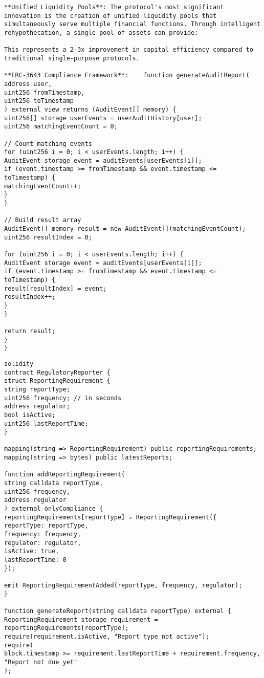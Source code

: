 \documentclass[12pt]{article}
\begin{document}
{{{\begin{itemize}
\begin{lstlisting}
**Unified Liquidity Pools**: The protocol's most significant innovation is the creation of unified liquidity pools that simultaneously serve multiple financial functions. Through intelligent rehypothecation, a single pool of assets can provide:

This represents a 2-3x improvement in capital efficiency compared to traditional single-purpose protocols.

**ERC-3643 Compliance Framework**:    function generateAuditReport(
address user,
uint256 fromTimestamp,
uint256 toTimestamp
) external view returns (AuditEvent[] memory) {
uint256[] storage userEvents = userAuditHistory[user];
uint256 matchingEventCount = 0;

// Count matching events
for (uint256 i = 0; i < userEvents.length; i++) {
AuditEvent storage event = auditEvents[userEvents[i]];
if (event.timestamp >= fromTimestamp && event.timestamp <= toTimestamp) {
matchingEventCount++;
}
}

// Build result array
AuditEvent[] memory result = new AuditEvent[](matchingEventCount);
uint256 resultIndex = 0;

for (uint256 i = 0; i < userEvents.length; i++) {
AuditEvent storage event = auditEvents[userEvents[i]];
if (event.timestamp >= fromTimestamp && event.timestamp <= toTimestamp) {
result[resultIndex] = event;
resultIndex++;
}
}

return result;
}
}
\end{lstlisting}

\end{itemize}


\begin{lstlisting}
solidity
contract RegulatoryReporter {
struct ReportingRequirement {
string reportType;
uint256 frequency; // in seconds
address regulator;
bool isActive;
uint256 lastReportTime;
}

mapping(string => ReportingRequirement) public reportingRequirements;
mapping(string => bytes) public latestReports;

function addReportingRequirement(
string calldata reportType,
uint256 frequency,
address regulator
) external onlyCompliance {
reportingRequirements[reportType] = ReportingRequirement({
reportType: reportType,
frequency: frequency,
regulator: regulator,
isActive: true,
lastReportTime: 0
});

emit ReportingRequirementAdded(reportType, frequency, regulator);
}

function generateReport(string calldata reportType) external {
ReportingRequirement storage requirement = reportingRequirements[reportType];
require(requirement.isActive, "Report type not active");
require(
block.timestamp >= requirement.lastReportTime + requirement.frequency,
"Report not due yet"
);


\end{lstlisting}}}}
\end{document}
